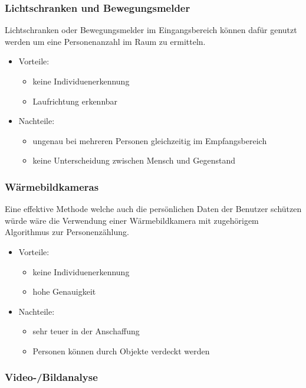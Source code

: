 \subsubsection{Lichtschranken und Bewegungsmelder}
\label{sec:Lichtschranken und Bewegungsmelder}

Lichtschranken oder Bewegungsmelder im Eingangsbereich können dafür genutzt
werden um eine Personenanzahl im Raum zu ermitteln.

\begin{itemize}
	\item Vorteile:
	\begin{itemize}
		\item keine Individuenerkennung
		\item Laufrichtung erkennbar
	\end{itemize}
	\item Nachteile:
	\begin{itemize}
		\item ungenau bei mehreren Personen gleichzeitig im Empfangsbereich
		\item keine Unterscheidung zwischen Mensch und Gegenstand
	\end{itemize}
\end{itemize}


\subsubsection{Wärmebildkameras}
\label{Wärmebildkameras}

Eine effektive Methode welche auch die persönlichen Daten der Benutzer
schützen würde wäre die Verwendung einer Wärmebildkamera mit zugehörigem
Algorithmus zur Personenzählung.

\begin{itemize}
	\item Vorteile:
	\begin{itemize}
		\item keine Individuenerkennung
		\item hohe Genauigkeit
	\end{itemize}
	\item Nachteile:
	\begin{itemize}
		\item sehr teuer in der Anschaffung
		\item Personen können durch Objekte verdeckt werden
	\end{itemize}
\end{itemize}

\subsubsection{ Video-/Bildanalyse}
\label{sec:Video-/Bildanalyse}

